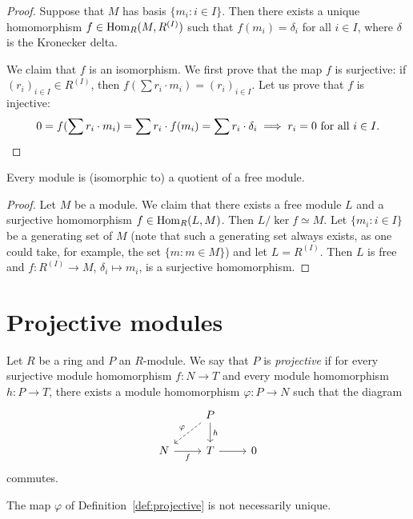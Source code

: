 \begin{proof}
Suppose that $M$ has basis $\{m_i:i\in I\}$. Then there exists a unique homomorphism
$f\in\operatorname{Hom}_R(M,R^{(I)})$ such that  
$f(m_i)=\delta_i$ for all $i\in I$, where $\delta$ is the Kronecker delta.  

We claim that $f$ is an isomorphism. We first prove that the map $f$ is surjective: if $(r_i)_{i\in I}\in R^{(I)}$, then
$f(\sum r_i\cdot m_i)=(r_i)_{i\in I}$. Let us prove that $f$ is injective: 
\[
0=f(\sum r_i\cdot m_i)=\sum r_i\cdot f(m_i)=\sum r_i\cdot\delta_i\implies r_i=0\text{ for all $i\in I$}.\qedhere
\]
\end{proof}

\begin{corollary}
Every module is (isomorphic to) a quotient of a free module.
\end{corollary}

\begin{proof}
Let $M$ be a module. We claim that there exists a free module $L$ and a surjective homomorphism $f\in\operatorname{Hom}_R(L,M)$. Then
$L/\ker f\simeq M$. Let $\{m_i:i\in I\}$
be a generating set of $M$ (note that such a generating set always exists, as one could take, for example, the set
$\{m:m\in M\}$) and let $L=R^{(I)}$. Then $L$ is free and $f\colon R^{(I)}\to M$, $\delta_i\mapsto m_i$, is a surjective 
homomorphism.
\end{proof}

\section{Projective modules}

\begin{definition}
    \label{def:projective}
    Let $R$ be a ring and $P$ an $R$-module. We say that $P$ is \emph{projective} if 
    for every surjective module homomorphism $f\colon N\to T$ 
    and every module homomorphism $h\colon P\to T$, 
    there exists a module homomorphism $\varphi\colon P\to N$ such that
    the diagram 
    \[\begin{tikzcd}
	& P \\
	N & T & 0
	\arrow["f"', from=2-1, to=2-2]
	\arrow[from=2-2, to=2-3]
	\arrow["h", from=1-2, to=2-2]
	\arrow["\varphi"', dashed, from=1-2, to=2-1]
\end{tikzcd}
\]
commutes. 
\end{definition}

The map $\varphi$ of Definition~\ref{def:projective} is not necessarily unique. 


